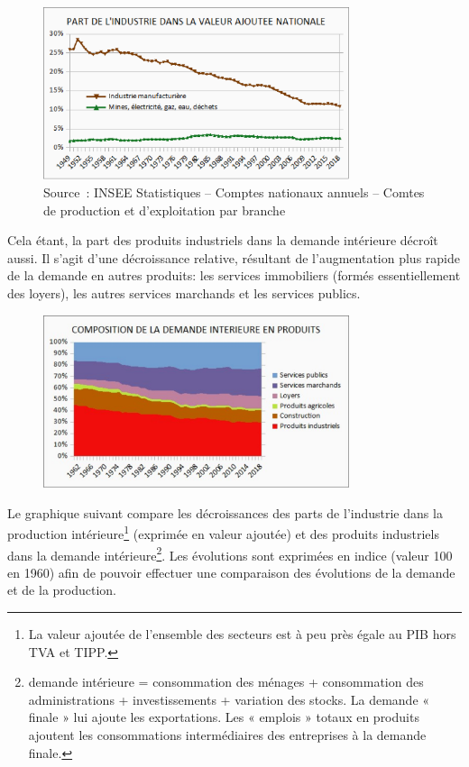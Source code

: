 \documentclass[a4paper]{article}
\begin{document}
\begin{figure}[H]
\centering
\includegraphics*[width=0.8\textwidth]{images/valeur-ajoutee}
\caption{Source~: INSEE Statistiques – Comptes nationaux annuels – Comtes de production et d’exploitation par branche}
\label{fig:valeur-ajoutee}
\end{figure}

Cela étant, la part des produits industriels dans la demande intérieure décroît aussi. Il s’agit d’une décroissance relative, résultant de l’augmentation plus rapide de la demande en autres produits: les services immobiliers (formés essentiellement des loyers), les autres services marchands et les services publics.

\begin{figure}[H]
\centering
\includegraphics*[width=0.8\textwidth]{images/demande-interieure}
\label{fig:demande-interieure}
\end{figure}

Le graphique suivant compare les décroissances des parts de l'industrie dans la production intérieure\footnote{La valeur ajoutée de l’ensemble des secteurs est à peu près égale au PIB hors TVA et TIPP.} (exprimée en valeur ajoutée) et des produits industriels dans la demande intérieure\footnote{demande intérieure = consommation des ménages + consommation des administrations + investissements + variation des stocks. La demande « finale » lui ajoute les exportations. Les « emplois » totaux en produits ajoutent les consommations intermédiaires des entreprises à la demande finale.}. Les évolutions sont exprimées en indice (valeur 100 en 1960) afin de pouvoir effectuer une comparaison des évolutions de la demande et de la production.
\end{document}
